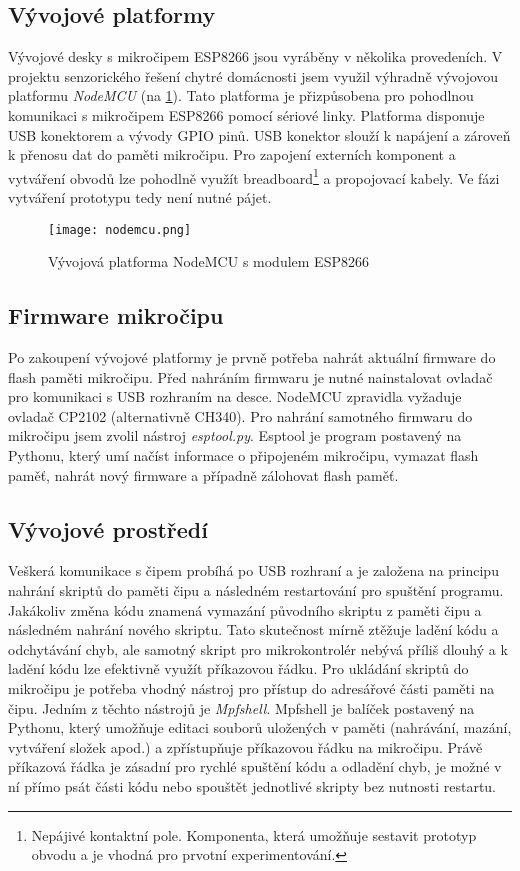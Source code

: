 \subsection*{Vývojové platformy}
Vývojové desky s mikročipem ESP8266 jsou vyráběny v několika provedeních. V projektu senzorického řešení chytré domácnosti jsem využil výhradně vývojovou platformu \textit{NodeMCU} (na \cref{fig:nodemcu}). Tato platforma je přizpůsobena pro pohodlnou komunikaci s mikročipem ESP8266 pomocí sériové linky. Platforma disponuje USB konektorem a vývody GPIO pinů. USB konektor slouží k napájení a zároveň k přenosu dat do paměti mikročipu. Pro zapojení externích komponent a vytváření obvodů lze pohodlně využít breadboard\footnote{Nepájivé kontaktní pole. Komponenta, která umožňuje sestavit prototyp obvodu a je vhodná pro prvotní experimentování.} a propojovací kabely. Ve fázi vytváření prototypu tedy není nutné pájet.

\begin{figure}[H]
  \centering
  \texttt{[image: nodemcu.png]}
  \caption{Vývojová platforma NodeMCU s modulem ESP8266}
  \label{fig:nodemcu}
\end{figure}

\subsection*{Firmware mikročipu}
Po zakoupení vývojové platformy je prvně potřeba nahrát aktuální firmware do flash paměti mikročipu. Před nahráním firmwaru je nutné nainstalovat ovladač pro komunikaci s USB rozhraním na desce. NodeMCU zpravidla vyžaduje ovladač CP2102 (alternativně CH340). Pro nahrání samotného firmwaru do mikročipu jsem zvolil nástroj \textit{esptool.py}. Esptool je program postavený na Pythonu, který umí načíst informace o připojeném mikročipu, vymazat flash paměť, nahrát nový firmware a případně zálohovat flash paměť.

\subsection*{Vývojové prostředí}
Veškerá komunikace s čipem probíhá po USB rozhraní a je založena na principu nahrání skriptů do paměti čipu a následném restartování pro spuštění programu. Jakákoliv změna kódu znamená vymazání původního skriptu z paměti čipu a následném nahrání nového skriptu. Tato skutečnost mírně ztěžuje ladění kódu a odchytávání chyb, ale samotný skript pro mikrokontrolér nebývá příliš dlouhý a k ladění kódu lze efektivně využít příkazovou řádku. Pro ukládání skriptů do mikročipu je potřeba vhodný nástroj pro přístup do adresářové části paměti na čipu. Jedním z těchto nástrojů je \textit{Mpfshell}. Mpfshell je balíček postavený na Pythonu, který umožňuje editaci souborů uložených v paměti (nahrávání, mazání, vytváření složek apod.) a zpřístupňuje příkazovou řádku na mikročipu. Právě příkazová řádka je zásadní pro rychlé spuštění kódu a odladění chyb, je možné v ní přímo psát části kódu nebo spouštět jednotlivé skripty bez nutnosti restartu.

